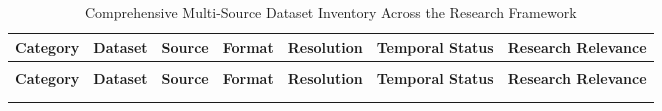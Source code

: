 \documentclass[11pt,a4paper]{article}
\begin{document}
\begin{xltabular}{\textwidth}{
  >{\raggedright\arraybackslash}p{1.9cm}
  >{\raggedright\arraybackslash}p{2.1cm}
  >{\raggedright\arraybackslash}p{1.9cm}
  >{\centering\arraybackslash}p{1.2cm}
  >{\raggedright\arraybackslash}p{1.9cm}
  >{\raggedright\arraybackslash}p{1.8cm}
  >{\raggedright\arraybackslash}X
}
\caption{Comprehensive Multi-Source Dataset Inventory Across the Research Framework} \label{tab:dataset_inventory} \\
\toprule
\textbf{Category} & \textbf{Dataset} & \textbf{Source} & \textbf{Format} & \textbf{Resolution} & \textbf{Temporal Status} & \textbf{Research Relevance} \\
\midrule
\endfirsthead

 \\
\toprule
\textbf{Category} & \textbf{Dataset} & \textbf{Source} & \textbf{Format} & \textbf{Resolution} & \textbf{Temporal Status} & \textbf{Research Relevance} \\
\midrule
\endhead

\midrule
{} \\
\bottomrule
\endfoot

\bottomrule
\endlastfoot


\end{xltabular}
\end{document}
